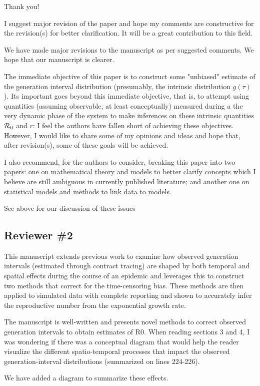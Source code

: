\documentclass[12pt]{article}
\newcommand{\Rx}[1]{\ensuremath{{\cal R}_{#1}}}
\newcommand{\Ro}{\Rx{0}}
\newcommand{\reviewer}{\subsection*}
\newcommand{\revtext}{\textsf}
\begin{document}
Thank you!

\revtext{
I suggest major revision of the paper and hope my comments are
constructive for the revision(s) for better clarification. It will be a
great contribution to this field.
}

We have made major revisions to the manuscript as per suggested comments.
We hope that our manuscript is clearer.

\revtext{
The immediate objective of this paper is to construct some "unbiased" estimate of the generation interval distribution (presumably, the intrinsic distribution $g(\tau)$). Its important goes beyond this immediate objective, that is, to attempt using quantities (assuming observable, at least conceptually) measured during a the very dynamic
phase of the system to make inferences on these intrinsic quantities
$\Ro$ and $r$: I feel the authors have fallen short of achieving these objectives. However, I would like to share some of my opinions and ideas
and hope that, after revision(s), some of these goals will be achieved.
}

\revtext{
I also recommend, for the authors to consider, breaking this paper
into two papers: one on mathematical theory and models to better
clarify concepts which I believe are still ambiguous in currently published literature; and another one on statistical models and methods
to link data to models.
}

See above for our discussion of these issues

\reviewer{Reviewer \#2}

\revtext{
This manuscript extends previous work to examine how observed generation intervals (estimated through contract tracing) are shaped by both temporal and spatial effects during the course of an epidemic and leverages this to construct two methods that correct for the time-censoring bias. These methods are then applied to simulated data with complete reporting and shown to accurately infer the reproductive number from the exponential growth rate.
}

\revtext{
The manuscript is well-written and presents novel methods to correct observed generation intervals to obtain estimates of R0. When reading sections 3 and 4, I was wondering if there was a conceptual diagram that would help the reader visualize the different spatio-temporal processes that impact the observed generation-interval distributions (summarized on lines 224-226).}

We have added a diagram to summarize these effects.
\end{document}
